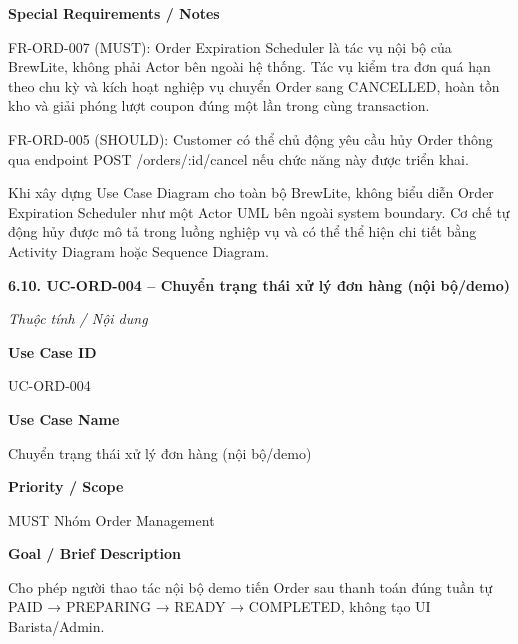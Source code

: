 \documentclass[11pt,a4paper,oneside]{report}
\begin{document}
\par\smallskip\noindent\textcolor{sgublue}{\textbf{Special Requirements / Notes}}\par\nobreak
FR-ORD-007 (MUST): Order Expiration Scheduler là tác vụ nội bộ của BrewLite, không phải Actor bên ngoài hệ thống. Tác vụ kiểm tra đơn quá hạn theo chu kỳ và kích hoạt nghiệp vụ chuyển Order sang CANCELLED, hoàn tồn kho và giải phóng lượt coupon đúng một lần trong cùng transaction.

FR-ORD-005 (SHOULD): Customer có thể chủ động yêu cầu hủy Order thông qua endpoint POST /orders/:id/cancel nếu chức năng này được triển khai.

Khi xây dựng Use Case Diagram cho toàn bộ BrewLite, không biểu diễn Order Expiration Scheduler như một Actor UML bên ngoài system boundary. Cơ chế tự động hủy được mô tả trong luồng nghiệp vụ và có thể thể hiện chi tiết bằng Activity Diagram hoặc Sequence Diagram.
\par



\textbf{6.10. UC-ORD-004 -- Chuyển trạng thái xử lý đơn hàng (nội bộ/demo)}



\par\noindent\textit{Thuộc tính / Nội dung}\par

\par\smallskip\noindent\textcolor{sgublue}{\textbf{Use Case ID}}\par\nobreak
UC-ORD-004
\par

\par\smallskip\noindent\textcolor{sgublue}{\textbf{Use Case Name}}\par\nobreak
Chuyển trạng thái xử lý đơn hàng (nội bộ/demo)
\par

\par\smallskip\noindent\textcolor{sgublue}{\textbf{Priority / Scope}}\par\nobreak
MUST \textbar{} Nhóm Order Management
\par

\par\smallskip\noindent\textcolor{sgublue}{\textbf{Goal / Brief Description}}\par\nobreak
Cho phép người thao tác nội bộ demo tiến Order sau thanh toán đúng tuần tự PAID → PREPARING → READY → COMPLETED, không tạo UI Barista/Admin.
\par
\end{document}
